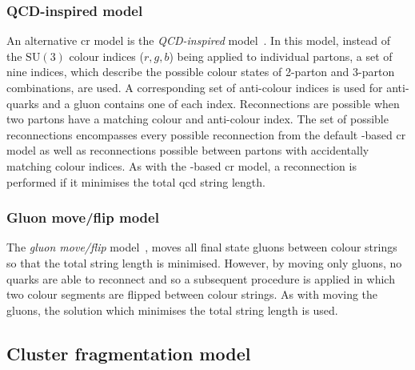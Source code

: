 \subsubsection{QCD-inspired model} %
\label{sub:qcd_inspired_model}

An alternative \acrshort{cr} model is the \textit{QCD-inspired} model~\cite{Gen:QCDBased}.
In this model, instead of the $\mathrm{SU(3)}$ colour indices ($r,g,b$) being applied to individual partons, a set of nine indices, which describe the possible colour states of 2-parton and 3-parton combinations, are used.
A corresponding set of anti-colour indices is used for anti-quarks and a gluon contains one of each index.
Reconnections are possible when two partons have a matching colour and anti-colour index.
The set of possible reconnections encompasses every possible reconnection from the default \MPI-based \acrshort{cr} model as well as reconnections possible between partons with accidentally matching colour indices.
As with the \MPI-based \acrshort{cr} model, a reconnection is performed if it minimises the total \acrshort{qcd} string length.

\subsubsection{Gluon move/flip model} %
\label{sub:gluon_move_flip_model}

The \textit{gluon move/flip} model~\cite{Gen:GluonMove}, moves all final state gluons between colour strings so that the total string length is minimised. 
However, by moving only gluons, no quarks are able to reconnect and so a subsequent procedure is applied in which two colour segments are flipped between colour strings.
As with moving the gluons, the solution which minimises the total string length is used.


\subsection{Cluster fragmentation model} %
\label{sub:cluster_fragmentation}


